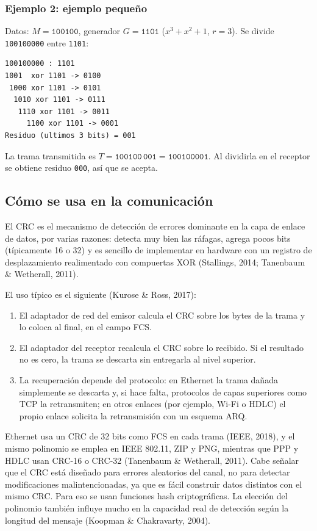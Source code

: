 \documentclass[12pt,letterpaper]{article}
\newcommand{\bits}[1]{\texttt{#1}}
\begin{document}
\subsubsection*{Ejemplo 2: ejemplo pequeño}
Datos: $M = \bits{100100}$, generador $G = \bits{1101}$ ($x^3 + x^2 + 1$, $r=3$). Se divide \bits{100100000} entre \bits{1101}:
\begin{verbatim}
100100000 : 1101
1001  xor 1101 -> 0100
 1000 xor 1101 -> 0101
  1010 xor 1101 -> 0111
   1110 xor 1101 -> 0011
     1100 xor 1101 -> 0001
Residuo (ultimos 3 bits) = 001
\end{verbatim}
La trama transmitida es $T = \bits{100100}\,\bits{001} = \bits{100100001}$. Al dividirla en el receptor se obtiene residuo \bits{000}, así que se acepta.

\subsection{Cómo se usa en la comunicación}
El CRC es el mecanismo de detección de errores dominante en la capa de enlace de datos, por varias razones: detecta muy bien las ráfagas, agrega pocos bits (típicamente 16 o 32) y es sencillo de implementar en hardware con un registro de desplazamiento realimentado con compuertas XOR (Stallings, 2014; Tanenbaum \& Wetherall, 2011).

El uso típico es el siguiente (Kurose \& Ross, 2017):
\begin{enumerate}[itemsep=2pt]
\item El adaptador de red del emisor calcula el CRC sobre los bytes de la trama y lo coloca al final, en el campo FCS.
\item El adaptador del receptor recalcula el CRC sobre lo recibido. Si el resultado no es cero, la trama se descarta sin entregarla al nivel superior.
\item La recuperación depende del protocolo: en Ethernet la trama dañada simplemente se descarta y, si hace falta, protocolos de capas superiores como TCP la retransmiten; en otros enlaces (por ejemplo, Wi-Fi o HDLC) el propio enlace solicita la retransmisión con un esquema ARQ.
\end{enumerate}
Ethernet usa un CRC de 32 bits como FCS en cada trama (IEEE, 2018), y el mismo polinomio se emplea en IEEE 802.11, ZIP y PNG, mientras que PPP y HDLC usan CRC-16 o CRC-32 (Tanenbaum \& Wetherall, 2011). Cabe señalar que el CRC está diseñado para errores aleatorios del canal, no para detectar modificaciones malintencionadas, ya que es fácil construir datos distintos con el mismo CRC. Para eso se usan funciones hash criptográficas. La elección del polinomio también influye mucho en la capacidad real de detección según la longitud del mensaje (Koopman \& Chakravarty, 2004).
\end{document}
